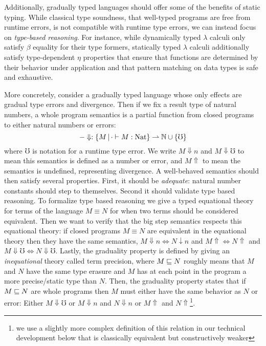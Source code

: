 Additionally, gradually typed languages should offer some of the
benefits of static typing. While classical type soundness, that
well-typed programs are free from runtime errors, is not compatible
with runtime type errors, we can instead focus on \emph{type-based
reasoning}. For instance, while dynamically typed $\lambda$ calculi
only satisfy $\beta$ equality for their type formers, statically typed
$\lambda$ calculi additionally satisfy type-dependent $\eta$
properties that ensure that functions are determined by their behavior
under application and that pattern matching on data types
is safe and exhaustive.

More concretely, consider a gradually typed language whose only
effects are gradual type errors and divergence. Then if we fix a
result type of natural numbers, a whole program semantics is a partial
function from closed programs to either natural numbers or errors:
\[ -\Downarrow : \{M \,|\, \cdot \vdash M : \text{Nat} \} \rightharpoonup \mathbb{N} \cup \{\mho\} \]
where $\mho$ is notation for a runtime type error. We write $M
\Downarrow n$ and $M\Downarrow \mho$ to mean this semantics is defined
as a number or error, and $M\Uparrow$ to mean the semantics is
undefined, representing divergence.
%
A well-behaved semantics should then satisfy several properties. First, it
should be \emph{adequate}: natural number constants should step to
themselves. Second it should validate type based reasoning. To
formalize type based reasoning we give a typed equational theory for
terms of the language $M \equiv N$ for when two terms should be
considered equivalent. Then we want to verify that the big step
semantics respects this equational theory: if closed programs $M \equiv
N$ are equivalent in the equational theory then they have the same
semantics, $M \Downarrow n \iff N \downarrow n$ and $M\Uparrow \iff N
\Uparrow$ and $M \Downarrow \mho \iff N \Downarrow \mho$.
%
Lastly, the graduality property is defined by giving an
\emph{inequational} theory called term precision, where $M \sqsubseteq N$
roughly means that $M$ and $N$ have the same type erasure and $M$ has
at each point in the program a more precise/static type than $N$.
%
Then, the graduality property states that if $M \sqsubseteq N$ are whole
programs then $M$ must either have the same behavior as $N$ or error:
Either $M\Downarrow \mho$ or $M \Downarrow n $ and $N \Downarrow n$ or
$M \Uparrow $ and $N \Uparrow$\footnote{we use a slightly more complex
definition of this relation in our technical development below that is
classically equivalent but constructively weaker}.

